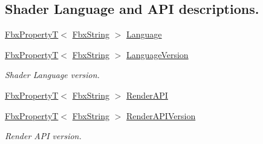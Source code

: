 \subsection*{Shader Language and A\+PI descriptions.}
\begin{DoxyCompactItemize}
\item 
\hyperlink{class_fbx_property_t}{Fbx\+PropertyT}$<$ \hyperlink{class_fbx_string}{Fbx\+String} $>$ \hyperlink{class_fbx_implementation_acda7f6c31ffe13c69bd3dbfa972a6fac}{Language}
\item 
\hyperlink{class_fbx_property_t}{Fbx\+PropertyT}$<$ \hyperlink{class_fbx_string}{Fbx\+String} $>$ \hyperlink{class_fbx_implementation_aebb544e23225701b6e92cd058bc09bab}{Language\+Version}
\begin{DoxyCompactList}\small\item\em Shader Language version. \end{DoxyCompactList}\item 
\hyperlink{class_fbx_property_t}{Fbx\+PropertyT}$<$ \hyperlink{class_fbx_string}{Fbx\+String} $>$ \hyperlink{class_fbx_implementation_ac127174c10e30bdf28d2e276c7818302}{Render\+A\+PI}
\item 
\hyperlink{class_fbx_property_t}{Fbx\+PropertyT}$<$ \hyperlink{class_fbx_string}{Fbx\+String} $>$ \hyperlink{class_fbx_implementation_a66ac67e482f39a4e71389f33f1c69648}{Render\+A\+P\+I\+Version}
\begin{DoxyCompactList}\small\item\em Render A\+PI version. \end{DoxyCompactList}\end{DoxyCompactItemize}
